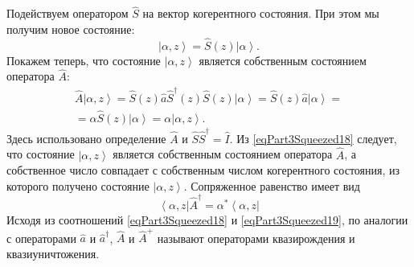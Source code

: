 Подействуем оператором $\hat{S}$ на вектор когерентного состояния. При
этом мы получим новое состояние:
\begin{equation}
\left|\alpha, z\right> = \hat{S}\left(z\right)\left|\alpha\right>.
\label{eqPart3Squeezed17}
\end{equation}
Покажем теперь, что состояние $\left|\alpha, z\right>$ является
собственным состоянием оператора $\hat{A}$:
\begin{eqnarray}
\hat{A}\left|\alpha, z\right> = 
\hat{S}\left(z\right)\hat{a}\hat{S}^{\dag}\left(z\right)\hat{S}\left(z\right)\left|\alpha\right>
= 
\hat{S}\left(z\right)\hat{a}\left|\alpha\right> = 
\nonumber \\
= \alpha \hat{S}\left(z\right)\left|\alpha\right> = 
\alpha \left|\alpha, z\right>.
\label{eqPart3Squeezed18}
\end{eqnarray}
Здесь использовано определение $\hat{A}$ и $\hat{S}\hat{S}^{\dag} = \hat{I}$.
Из \eqref{eqPart3Squeezed18} следует, что состояние $\left|\alpha, z\right>$ является
собственным состоянием оператора $\hat{A}$, а собственное число совпадает с
собственным числом когерентного состояния, из которого получено
состояние $\left|\alpha, z\right>$.
Сопряженное равенство имеет вид
\begin{equation}
\left<\alpha, z\right|\hat{A}^{\dag} = 
\alpha^{*}\left<\alpha, z\right|
\label{eqPart3Squeezed19}
\end{equation}
Исходя из соотношений \eqref{eqPart3Squeezed18} и
\eqref{eqPart3Squeezed19}, по аналогии с операторами $\hat{a}$ и
$\hat{a}^{\dag}$, $\hat{A}$ и $\hat{A}^{+}$ называют операторами
квазирождения и квазиуничтожения.

